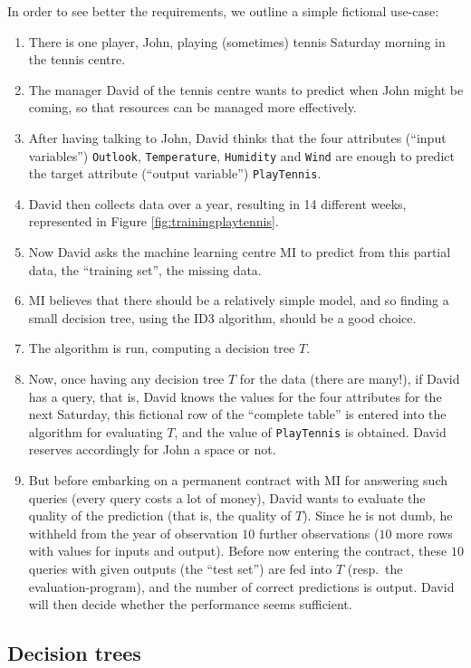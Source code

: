 \documentclass{report}
\begin{document}
In order to see better the requirements, we outline a simple fictional use-case:
\begin{enumerate}
\item There is one player, John, playing (sometimes) tennis Saturday morning in the tennis centre.
\item The manager David of the tennis centre wants to predict when John might be coming, so that resources can be managed more effectively.
\item After having talking to John, David thinks that the four attributes (``input variables'') \texttt{Outlook}, \texttt{Temperature}, \texttt{Humidity} and \texttt{Wind} are enough to predict the target attribute (``output variable'') \texttt{PlayTennis}.
\item David then collects data over a year, resulting in 14 different weeks, represented in Figure \ref{fig:trainingplaytennis}.
\item Now David asks the machine learning centre MI to predict from this partial data, the ``training set'', the missing data.
\item MI believes that there should be a relatively simple model, and so finding a small decision tree, using the ID3 algorithm, should be a good choice.
\item The algorithm is run, computing a decision tree $T$.
\item Now, once having any decision tree $T$ for the data (there are many!), if David has a query, that is, David knows the values for the four attributes for the next Saturday, this fictional row of the ``complete table'' is entered into the algorithm for evaluating $T$, and the value of \texttt{PlayTennis} is obtained. David reserves accordingly for John a space or not.
\item But before embarking on a permanent contract with MI for answering such queries (every query costs a lot of money), David wants to evaluate the quality of the prediction (that is, the quality of $T$). Since he is not dumb, he withheld from the year of observation $10$ further observations ($10$ more rows with values for inputs and output). Before now entering the contract, these $10$ queries with given outputs (the ``test set'') are fed into $T$ (resp.\ the evaluation-program), and the number of correct predictions is output. David will then decide whether the performance seems sufficient.
\end{enumerate}




\subsection{Decision trees}
\label{sec:dectree}
\end{document}
